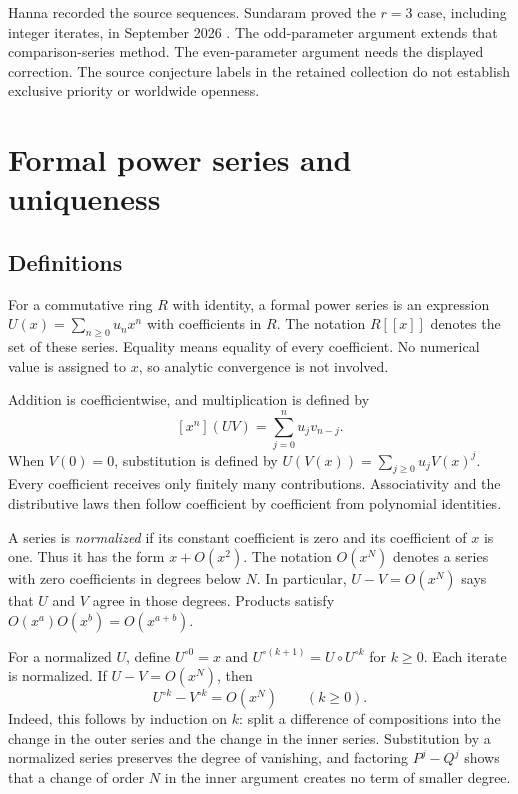 \documentclass[11pt,a4paper]{article}
\theoremstyle{remark}\newtheorem{remark}[theorem]{Remark}
\newcommand{\coeff}[2]{[x^{#1}]#2}
\begin{document}
Hanna recorded the source sequences. Sundaram proved the $r=3$ case,
including integer iterates, in September 2026 \cite{sundaram}. The
odd-parameter argument extends that comparison-series method.
The even-parameter argument needs the displayed correction. The source
conjecture labels in the retained collection do not establish exclusive
priority or worldwide openness.
\section{Formal power series and uniqueness}\label{sec:formal}

\subsection{Definitions}

For a commutative ring $R$ with identity, a formal power series is an
expression $U(x)=\sum_{n\ge0}u_nx^n$ with coefficients in $R$.
The notation $R[[x]]$ denotes the set of these series. Equality means
equality of every coefficient. No numerical value is assigned to $x$,
so analytic convergence is not involved.

Addition is coefficientwise, and multiplication is defined by
\[
\coeff{n}{(UV)}=\sum_{j=0}^n u_jv_{n-j}.
\]
When $V(0)=0$, substitution is defined by
$U(V(x))=\sum_{j\ge0}u_jV(x)^j$. Every coefficient receives only
finitely many contributions. Associativity and the distributive laws
then follow coefficient by coefficient from polynomial identities.

A series is \emph{normalized} if its constant coefficient is zero
and its coefficient of $x$ is one. Thus it has the form $x+O(x^2)$.
The notation $O(x^N)$ denotes a series with zero coefficients in
degrees below $N$. In particular, $U-V=O(x^N)$ says that $U$ and $V$
agree in those degrees. Products satisfy
$O(x^a)O(x^b)=O(x^{a+b})$.

For a normalized $U$, define $U^{\circ0}=x$ and
$U^{\circ(k+1)}=U\circ U^{\circ k}$ for $k\ge0$.
Each iterate is normalized. If $U-V=O(x^N)$, then
\begin{equation}\label{eq:iterate-congruence}
U^{\circ k}-V^{\circ k}=O(x^N)\qquad(k\ge0).
\end{equation}
Indeed, this follows by induction on $k$: split a difference of
compositions into the change in the outer series and the change in
the inner series. Substitution by a normalized series preserves the
degree of vanishing, and factoring $P^j-Q^j$ shows that a change of
order $N$ in the inner argument creates no term of smaller degree.
\end{document}
